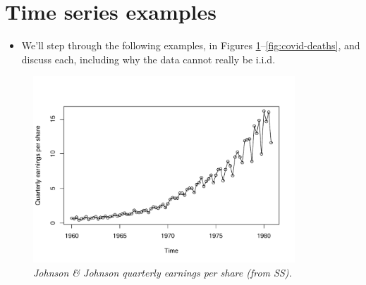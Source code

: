 \documentclass{article}
\begin{document}
\section{Time series examples}

\begin{itemize}
\item We'll step through the following examples, in Figures
  \ref{fig:jj}--\ref{fig:covid-deaths}, and discuss each, including why the data
  cannot really be i.i.d.\   
\end{itemize}

\begin{figure}[h]
\centering
\includegraphics[width=0.875\textwidth]{fig/jj-1.pdf}
\caption{\it Johnson \& Johnson quarterly earnings per share (from SS).}
\label{fig:jj}
\end{figure}
\end{document}
